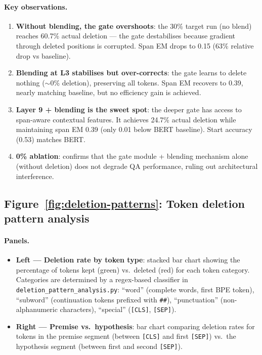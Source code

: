 \documentclass{article} %
\begin{document}
\paragraph{Key observations.}
\begin{enumerate}[nosep]
    \item \textbf{Without blending, the gate overshoots}: the 30\% target run (no blend) reaches 60.7\% actual deletion --- the gate destabilises because gradient through deleted positions is corrupted. Span EM drops to 0.15 (63\% relative drop vs baseline).
    \item \textbf{Blending at L3 stabilises but over-corrects}: the gate learns to delete nothing ($\sim$0\% deletion), preserving all tokens. Span EM recovers to 0.39, nearly matching baseline, but no efficiency gain is achieved.
    \item \textbf{Layer 9 + blending is the sweet spot}: the deeper gate has access to span-aware contextual features. It achieves 24.7\% actual deletion while maintaining span EM 0.39 (only 0.01 below BERT baseline). Start accuracy (0.53) matches BERT.
    \item \textbf{0\% ablation}: confirms that the gate module + blending mechanism alone (without deletion) does not degrade QA performance, ruling out architectural interference.
\end{enumerate}



\subsection{Figure~\ref{fig:deletion-patterns}: Token deletion pattern analysis}

\paragraph{Panels.}
\begin{itemize}[nosep]
    \item \textbf{Left --- Deletion rate by token type}: stacked bar chart showing the percentage of tokens kept (green) vs.\ deleted (red) for each token category. Categories are determined by a regex-based classifier in \texttt{deletion\_pattern\_analysis.py}: ``word'' (complete words, first BPE token), ``subword'' (continuation tokens prefixed with \texttt{\#\#}), ``punctuation'' (non-alphanumeric characters), ``special'' (\texttt{[CLS]}, \texttt{[SEP]}).
    \item \textbf{Right --- Premise vs.\ hypothesis}: bar chart comparing deletion rates for tokens in the premise segment (between \texttt{[CLS]} and first \texttt{[SEP]}) vs.\ the hypothesis segment (between first and second \texttt{[SEP]}).
\end{itemize}
\end{document}
